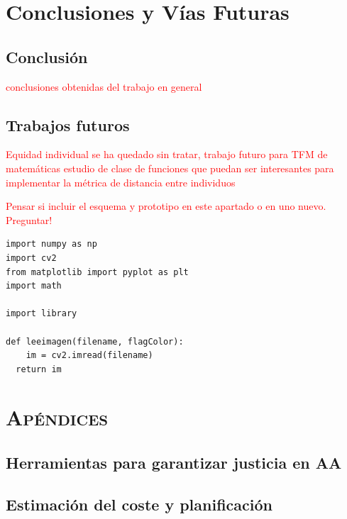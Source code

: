\documentclass[oneside,openright,titlepage,numbers=noenddot,openany,headinclude,footinclude=true,
cleardoublepage=empty,abstractoff,BCOR=5mm,paper=a4,fontsize=12pt,main=spanish]{scrreprt}
\begin{document}
\part{Conclusiones y Vías Futuras} \label{part:debate_fut}

\chapter{Conclusión}

\textcolor{red}{conclusiones obtenidas del trabajo en general}

\chapter{Trabajos futuros}

\textcolor{red}{Equidad individual se ha quedado sin tratar, trabajo futuro para TFM de matemáticas estudio de clase de funciones que puedan ser interesantes para implementar la métrica de distancia entre individuos}

\textcolor{red}{Pensar si incluir el esquema y prototipo en este apartado o en uno nuevo. Preguntar!}

\begin{verbatim}
import numpy as np
import cv2
from matplotlib import pyplot as plt
import math

import library

def leeimagen(filename, flagColor):
    im = cv2.imread(filename)
  return im
\end{verbatim}



\ctparttext{\color{black}\begin{center}
\end{center}}
\part*{\textsc{Apéndices}}

\appendix
\chapter{Herramientas para garantizar justicia en AA}\label{ap:herr_just}


\chapter{Estimación del coste y planificación}\label{ap:coste_plan}

\end{document}
